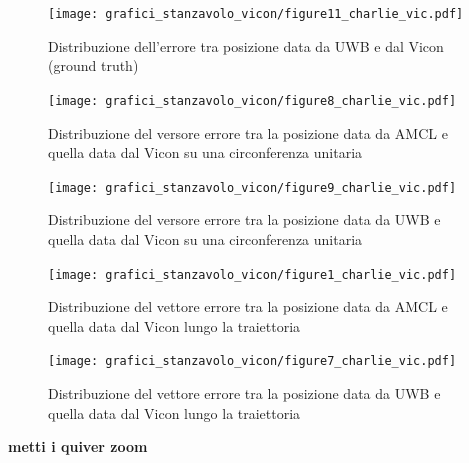 \begin{figure}[] 
	\centering    
	\texttt{[image: grafici\_stanzavolo\_vicon/figure11\_charlie\_vic.pdf]}
	\caption{Distribuzione dell'errore tra posizione data da UWB e dal Vicon (ground truth)}
	\label{fig: err_uwbvic_sphere_vicon_charlie}
\end{figure}


\begin{figure}[] 
	\centering    
	\texttt{[image: grafici\_stanzavolo\_vicon/figure8\_charlie\_vic.pdf]}
	\caption{Distribuzione del versore errore tra la posizione data da AMCL e quella data dal Vicon su una circonferenza unitaria}
	\label{fig: err_norm_amclvic_sphere_vicon_charlie}
\end{figure}

\begin{figure}[] 
	\centering    
	\texttt{[image: grafici\_stanzavolo\_vicon/figure9\_charlie\_vic.pdf]}
	\caption{Distribuzione del versore errore tra la posizione data da UWB e quella data dal Vicon su una circonferenza unitaria}
	\label{fig: err_norm_uwbvic_sphere_vicon_charlie}
\end{figure}

\begin{figure}[] 
	\centering    
	\texttt{[image: grafici\_stanzavolo\_vicon/figure1\_charlie\_vic.pdf]}
	\caption{Distribuzione del vettore errore tra la posizione data da AMCL e quella data dal Vicon lungo la traiettoria}
	\label{fig: quiver_err_amclvic_vicon_charlie}
\end{figure}

\begin{figure}[] 
	\centering    
	\texttt{[image: grafici\_stanzavolo\_vicon/figure7\_charlie\_vic.pdf]}
	\caption{Distribuzione del vettore errore tra la posizione data da UWB e quella data dal Vicon lungo la traiettoria}
	\label{fig: quiver_err_uwbvic_vicon_charlie}
\end{figure}

\textbf{metti i quiver zoom}

